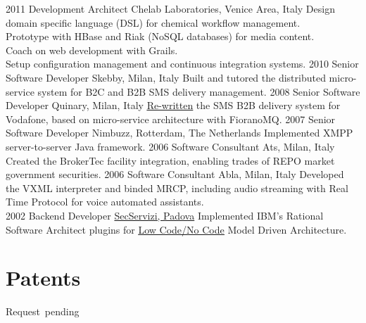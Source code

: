 \documentclass[letterpaper]{twentysecondcv} %
\begin{document}
\begin{twenty}
    	\twentyitem
    	{2011}
    	{}
    	{Development Architect}
    	{Chelab Laboratories, Venice Area, Italy}
    	{}
    	{
    	Design domain specific language (DSL) for chemical workflow management.\\
    	Prototype with HBase and Riak (NoSQL databases) for media content.\\
    	Coach on web development with Grails.\\
    	Setup configuration management and continuous integration systems.
    	}
    	\twentyitem
    	{2010}
    	{}
    	{Senior Software Developer}
    	{Skebby, Milan, Italy}
    	{}
    	{
    	Built and tutored the distributed micro-service system for B2C and B2B SMS delivery management.
    	}
    	\twentyitem
    	{2008}
    	{}
    	{Senior Software Developer}
    	{Quinary, Milan, Italy}
    	{}
    	{
    	\href{https://gfrison.com/2009/04/24/powered-by-apache-mina/}{\underline{Re-written}} the SMS B2B delivery system for Vodafone, based on micro-service architecture with FioranoMQ.
    	}
    	\twentyitem
    	{2007}
    	{}
    	{Senior Software Developer}
    	{Nimbuzz, Rotterdam, The Netherlands}
    	{}
    	{
    Implemented XMPP server-to-server Java framework.
    	}
    	\twentyitem
    	{2006}
    	{}
    	{Software Consultant}
    	{Ats, Milan, Italy}
    	{}
    	{
    Created the BrokerTec facility integration, enabling trades of REPO market government securities.
    	}
    	\twentyitem
    	{2006}
    	{}
    	{Software Consultant}
    	{Abla, Milan, Italy}
    	{}
    	{
    Developed the VXML interpreter and binded MRCP, including audio streaming with Real Time Protocol for voice automated assistants.
    	}
   	\\
     \twentyitem
   		{2002}
		{}
        {Backend Developer}
        {\href{}{SecServizi, Padova}}
        {}
        {
    Implemented IBM's Rational Software Architect plugins for \href{https://gfrison.com/tags/\#low-code-no-code}{\underline{Low Code/No Code}} Model Driven Architecture.
       	}

\end{twenty}

\section{Patents}
\begin{twenty}
{Request~pending}


\end{twenty}
\end{document}
